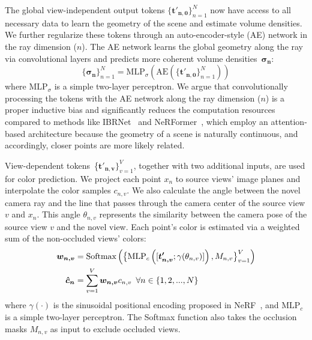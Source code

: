The global view-independent output tokens $\{\boldsymbol{t'_{n,0}}\}_{n=1}^{N}$ now have access to all necessary data to learn the geometry of the scene and estimate volume densities. We further regularize these tokens through an auto-encoder-style (AE) network in the ray dimension ($n$). The AE network learns the global geometry along the ray via convolutional layers and predicts more coherent volume densities~$\boldsymbol{\sigma_{n}}$:
\begin{equation}
    \{\boldsymbol{\sigma_{n}}\}_{n=1}^{N} = \text{MLP}_{\sigma} \left( \text{AE} \left(\{\boldsymbol{t'_{n,0}}\}_{n=1}^{N} \right) \right)
\end{equation}
where $\text{MLP}_{\sigma}$ is a simple two-layer perceptron. We argue that convolutionally processing the tokens with the AE network along the ray dimension ($n$) is a proper inductive bias and significantly reduces the computation resources compared to methods like IBRNet~\citep{wang2021ibrnet} and NeRFormer~\citep{reizenstein2021common}, which employ an attention-based architecture because the geometry of a scene is naturally continuous, and accordingly, closer points are more likely related.

View-dependent tokens~\{$\boldsymbol{t'_{n,v}}\}_{v=1}^{V}$, together with two additional inputs, are used for color prediction. We project each point $x_{n}$ to source views' image planes and interpolate the color samples $c_{n,v}$. We also calculate the angle between the novel camera ray and the line that passes through the camera center of the source view $v$ and $x_{n}$. This angle $\theta_{n,v}$ represents the similarity between the camera pose of the source view $v$ and the novel view. Each point's color is estimated via a weighted sum of the non-occluded views' colors:
\begin{align}
\boldsymbol{w_{n,v}} &= \text{Softmax} \left ( \big \{\text{MLP}_c \left ([\boldsymbol{t'_{n,v}}; \gamma(\theta_{n,v})] \right ),M_{n,v} \big \}_{v=1}^{V} \right ) \notag
\\
\boldsymbol{\hat{c}_{n}} &= \sum_{v=1}^{V} \boldsymbol{w_{n,v}}c_{n,v} \phantom{0} \forall n \in \{1, 2, ..., N\}
\end{align}
where $\gamma(\cdot)$ is the sinusoidal positional encoding proposed in NeRF~\citep{mildenhall2020nerf}, and $\text{MLP}_{c}$ is a simple two-layer perceptron. The Softmax function also takes the occlusion masks $M_{n,v}$ as input to exclude occluded views.

